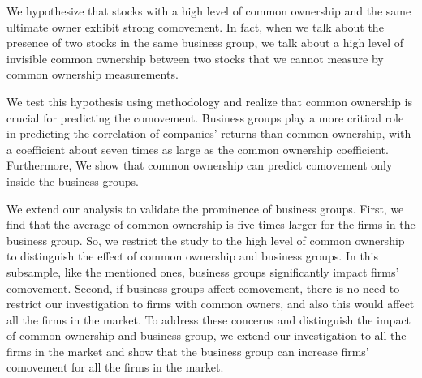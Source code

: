


%	
%	


We hypothesize that stocks with a high level of common ownership and the same ultimate owner exhibit strong comovement. In fact, when we talk about the presence of two stocks in the same business group, we talk about a high level of invisible  common ownership between two stocks that we cannot measure by common ownership measurements. 

\reversemarginpar
We test this hypothesis using \cite{AntonPolk} methodology  and realize that common ownership is crucial for predicting the comovement. Business groups play a more critical role in predicting the correlation of companies' returns than common ownership, with a coefficient about seven times as large as the common ownership coefficient.
 Furthermore, We show that common ownership can predict comovement only inside the business groups.


We extend our analysis to validate the prominence of business groups. First, we find that the average of common ownership is five times larger for the firms in the business group. So, we restrict the study to the high level of common ownership to distinguish the effect of common ownership and business groups. In this subsample, like the mentioned ones, business groups significantly impact firms' comovement. Second, if business groups affect comovement, there is no need to restrict our investigation to firms with common owners, and also this would affect all the firms in the market. To address these concerns and distinguish the impact of common ownership and business group, we extend our investigation to all the firms in the market and show that the business group can increase firms' comovement for all the firms in the market. 
	
